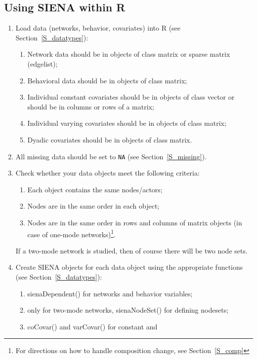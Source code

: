 \documentclass[a4paper,fleqn,11pt]{article}
\newcommand{\+}{\, + \,}
\newcommand{\sfn}[1]{\textsf{#1}}
\newcommand{\R}{{\sf R }}
\newcommand{\Rn}{{\sf R}}
\newcommand{\SI}{{\sf SIENA }}
\begin{document}
\subsection{Using \SI within \Rn}

   \begin{enumerate}
	\item	Load data (networks, behavior, covariates) into \R
            (see Section~\ref{S_datatypes}):
	\begin{enumerate}
		\item Network data should be in objects of class matrix or
            sparse matrix (edgelist);
		\item	Behavioral data should be in objects of class matrix;
		\item	Individual constant covariates should be in objects of
            class vector or should be in columns or rows of a matrix;
		\item	Individual varying covariates should be in objects of class matrix;
		\item	Dyadic covariates should be in objects of class matrix.
	\end{enumerate}
	\item	All missing data should be set to \texttt{NA} (see Section~\ref{S_missing}).
	\item Check whether your data objects meet the following criteria:
	\begin{enumerate}
		\item	Each object contains the same nodes/actors;
		\item	Nodes are in the same order in each object;
		\item	Nodes are in the same order in rows and columns of matrix
                objects (in case of one-mode networks)\footnote{For
		directions on how to handle composition change, see Section~\ref{S_comp}}.
	\end{enumerate}
   If a two-mode network is studied, then of course there will
   be two node sets.
	\item	Create \SI objects for each data object using the appropriate
                functions (see Section~\ref{S_datatypes}):
	\begin{enumerate}
		\item	\sfn{sienaDependent()} for networks and behavior variables;
		\item	only for two-mode networks, \sfn{sienaNodeSet()} for defining nodesets;
		\item	\sfn{coCovar()} and \sfn{varCovar()} for constant and

\end{enumerate}
\end{enumerate}
\end{document}

